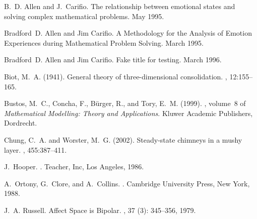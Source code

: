 \documentclass{article}
\begin{document}
%

\begin{thebibliography}{}

B.~D. Allen and J.~Carifio.
\newblock The relationship between emotional states and solving complex
  mathematical problems.
\newblock May 1995{}.

Bradford~D. Allen and Jim Carifio.
\newblock A {M}ethodology for the {A}nalysis of {E}motion {E}xperiences during
  {M}athematical {P}roblem {S}olving.
\newblock March 1995{}.

Bradford~D. Allen and Jim Carifio.
\newblock Fake title for testing.
\newblock March 1996.

Biot, M.~A. (1941).
\newblock General theory of three-dimensional consolidation.
, 12:155--165.

Bustos, M.~C., Concha, F., B\"{u}rger, R., and Tory, E.~M. (1999).
, volume~8 of {\em Mathematical Modelling: Theory and
  Applications}.
\newblock Kluwer Academic Publishers, Dordrecht.

Chung, C.~A. and Worster, M.~G. (2002).
\newblock Steady-state chimneys in a mushy layer.
, 455:387--411.

J.~Hooper.
.
\newblock Teacher, Inc, Los Angeles, 1986.

A.~Ortony, G.~Clore, and A.~Collins.
.
\newblock Cambridge University Press, New York, 1988.

J.~A. Russell.
\newblock Affect {S}pace is {B}ipolar.
, 37
  (3): 345--356, 1979.
\end{thebibliography}
\end{document}
